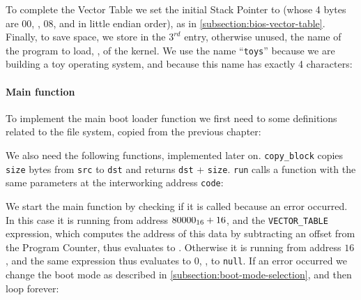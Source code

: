 To complete the Vector Table we set the initial Stack Pointer to
 (whose 4 bytes are 00, , 08, and
 in little endian order), as in
\cref{subsection:bios-vector-table}. Finally, to save space, we store in the
$3^{rd}$ entry, otherwise unused, the name of the program to load, \ie, of the
kernel. We use the name ``{\tt toys}'' because we are building a toy operating
system, and because this name has exactly 4 characters:



\medskip
\paragraph{Main function}

To implement the main boot loader function we first need to some definitions
related to the file system, copied from the previous chapter:


We also need the following functions, implemented later on. {\tt copy\_block}
copies {\tt size} bytes from {\tt src} to {\tt dst} and returns {\tt dst} +
{\tt size}. {\tt run} calls a function with the same parameters at the
interworking address {\tt code}:


We start the main function by checking if it is called because an error
occurred. In this case it is running from address $80000_{16}+16$, and the
{\tt VECTOR\_TABLE} expression, which computes the address of this data by
subtracting an offset from the Program Counter, thus evaluates to .
Otherwise it is running from address $16$, and the same expression thus
evaluates to 0, \ie, to {\tt null}. If an error occurred we change the boot
mode as described in \cref{subsection:boot-mode-selection}, and then loop
forever:

